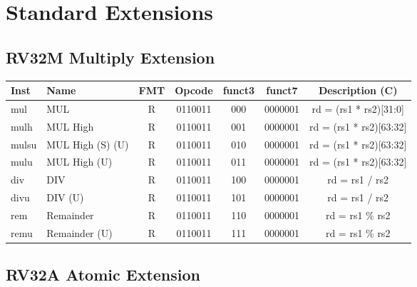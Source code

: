 \section*{Standard Extensions}

\subsection*{RV32M Multiply Extension}
\begin{center}
\begin{tabular}
{T | l | c | c | c | c | C } \hline
\rm Inst & Name              & FMT & \rm Opcode & \rm funct3 & \rm funct7 & \rm Description (C)     \\ \hline
mul      & MUL               & R   & 0110011    & 000    & 0000001   & rd = (rs1 * rs2)[31:0]  \\
mulh     & MUL High          & R   & 0110011    & 001    & 0000001   & rd = (rs1 * rs2)[63:32] \\
mulsu    & MUL High (S) (U)  & R   & 0110011    & 010    & 0000001   & rd = (rs1 * rs2)[63:32] \\
mulu     & MUL High (U)      & R   & 0110011    & 011    & 0000001   & rd = (rs1 * rs2)[63:32] \\
div      & DIV               & R   & 0110011    & 100    & 0000001   & rd = rs1 / rs2          \\
divu     & DIV (U)           & R   & 0110011    & 101    & 0000001   & rd = rs1 / rs2          \\
rem      & Remainder         & R   & 0110011    & 110    & 0000001   & rd = rs1 \% rs2         \\
remu     & Remainder (U)     & R   & 0110011    & 111    & 0000001   & rd = rs1 \% rs2         \\
\hline
\end{tabular}
\end{center}

\subsection*{RV32A Atomic Extension}


